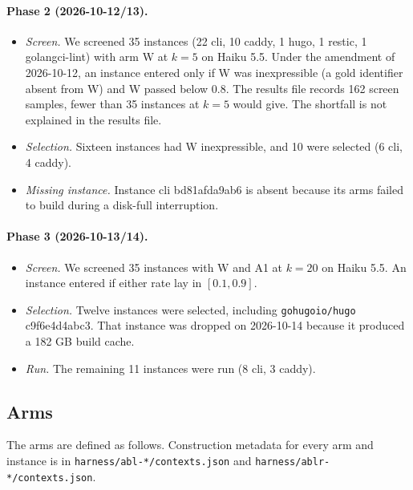 \paragraph{Phase 2 (2026-10-12/13).}
\begin{itemize}
\item \emph{Screen.} We screened 35 instances (22 cli, 10 caddy, 1 hugo, 1 restic, 1 golangci-lint) with arm W at $k=5$ on Haiku 5.5. Under the amendment of 2026-10-12, an instance entered only if W was inexpressible (a gold identifier absent from W) and W passed below 0.8. The results file records 162 screen samples, fewer than 35 instances at $k=5$ would give. The shortfall is not explained in the results file.
\item \emph{Selection.} Sixteen instances had W inexpressible, and 10 were selected (6 cli, 4 caddy).
\item \emph{Missing instance.} Instance cli bd81afda9ab6 is absent because its arms failed to build during a disk-full interruption.
\end{itemize}

\paragraph{Phase 3 (2026-10-13/14).}
\begin{itemize}
\item \emph{Screen.} We screened 35 instances with W and A1 at $k=20$ on Haiku 5.5. An instance entered if either rate lay in $[0.1, 0.9]$.
\item \emph{Selection.} Twelve instances were selected, including \texttt{gohugoio/hugo} c9f6e4d4abc3. That instance was dropped on 2026-10-14 because it produced a 182 GB build cache.
\item \emph{Run.} The remaining 11 instances were run (8 cli, 3 caddy).
\end{itemize}

\subsection{Arms}

The arms are defined as follows. Construction metadata for every arm and instance is in \texttt{harness/abl-*/contexts.json} and \texttt{harness/ablr-*/contexts.json}.

